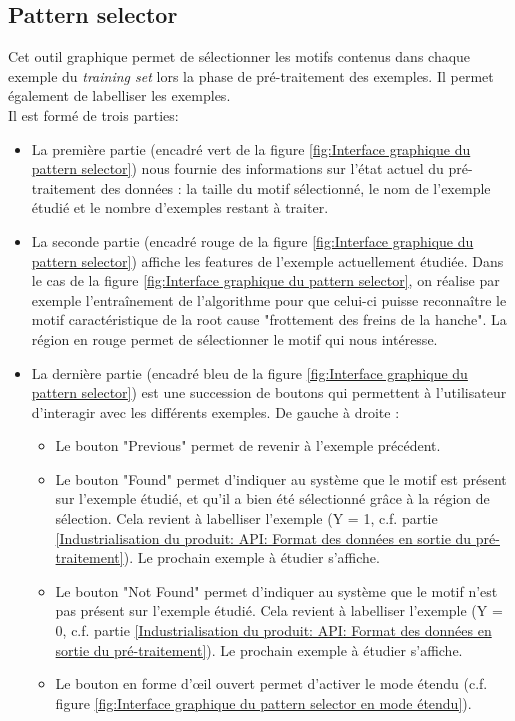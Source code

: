 \subsection{Pattern selector}
\label{Industrialisation du produit: Outils graphiques: Pattern selection}
Cet outil graphique permet de sélectionner les motifs contenus dans chaque exemple du \emph{training set} lors la phase de pré-traitement des exemples.  Il permet également  de labelliser les exemples. \\
Il est formé de trois parties:
\begin{itemize}
	\item La première partie (encadré vert de la figure \ref{fig:Interface graphique du pattern selector}) nous fournie des informations sur l'état actuel du pré-traitement des données : la taille du motif sélectionné, le nom de l'exemple étudié et le nombre d'exemples restant à traiter. 
	\item La seconde partie (encadré rouge de la figure  \ref{fig:Interface graphique du pattern selector}) affiche les features de l'exemple actuellement étudiée. Dans le cas de la figure  \ref{fig:Interface graphique du pattern selector}, on réalise par exemple l'entraînement de l'algorithme pour que celui-ci puisse reconnaître le motif caractéristique de la root cause "frottement des freins de la hanche". La région en rouge permet de sélectionner le motif qui nous intéresse.
	\item La dernière partie (encadré bleu de la figure  \ref{fig:Interface graphique du pattern selector}) est une succession de boutons qui permettent à l'utilisateur d'interagir avec les différents exemples. De gauche à droite :   
	\begin{itemize}
		\item Le  bouton "Previous" permet de revenir à l'exemple précédent.
		\item Le bouton "Found" permet d'indiquer au système que le motif est présent sur l'exemple étudié, et qu'il a bien été sélectionné grâce à la région de sélection. Cela revient à labelliser l'exemple (Y = 1, c.f. partie \ref{Industrialisation du produit: API: Format des données en sortie du pré-traitement}). Le prochain exemple à étudier s'affiche.
		\item Le bouton "Not Found" permet d'indiquer au système que le motif n'est pas présent sur l'exemple étudié. Cela revient à labelliser l'exemple (Y = 0, c.f. partie \ref{Industrialisation du produit: API: Format des données en sortie du pré-traitement}). Le prochain exemple à étudier s'affiche.
		\item Le bouton en forme d'œil ouvert permet d'activer le mode étendu (c.f. figure \ref{fig:Interface graphique du pattern selector en mode étendu}).
	\end{itemize} 
\end{itemize} 

